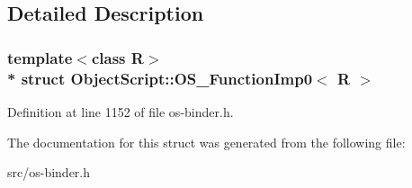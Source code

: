 \subsection{Detailed Description}
\subsubsection*{template$<$class R$>$\\*
struct Object\+Script\+::\+O\+S\+\_\+\+Function\+Imp0$<$ R $>$}



Definition at line 1152 of file os-\/binder.\+h.



The documentation for this struct was generated from the following file\+:\begin{DoxyCompactItemize}
\item 
src/os-\/binder.\+h\end{DoxyCompactItemize}
